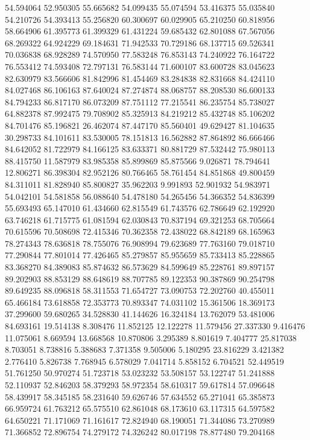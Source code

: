 54.594064
52.950305
55.665682
54.099435
55.074594
53.416375
55.035840
54.210726
54.393413
55.256820
60.300697
60.029905
65.210250
60.818956
58.664906
61.395773
61.399329
61.431224
59.685432
62.801088
67.567056
68.269322
64.924229
69.184631
71.942533
70.729186
68.137715
69.526341
70.036838
68.928289
74.570950
77.583248
76.853143
74.240922
76.164722
76.553412
74.593408
72.797131
76.583144
71.600107
83.600728
83.045623
82.630979
83.566606
81.842996
81.454469
83.284838
82.831668
84.424110
84.027468
86.106163
87.640024
87.274874
88.068757
88.208530
86.600133
84.794233
86.817170
86.073209
87.751112
77.215541
86.235754
85.738027
64.882378
87.992475
79.708902
85.325913
84.219212
85.432748
85.106202
84.701476
85.196821
26.462074
87.447170
85.560401
49.629427
81.104635
30.298733
84.101611
83.530005
78.151813
16.562882
87.864892
86.666466
84.642052
81.722979
84.166125
83.633371
80.881729
87.532442
75.980113
88.415750
11.587979
83.985358
85.899869
85.875566
9.026871
78.794641
12.806271
86.398304
82.952126
80.766465
58.761454
84.851868
49.800459
84.311011
81.828940
85.800827
35.962203
9.991893
52.901932
54.983971
54.042101
54.581858
56.088640
54.478180
54.265456
54.366352
54.836399
55.693493
65.147010
61.434660
62.815549
61.743576
62.786649
62.192920
63.746218
61.715775
61.081594
62.030843
70.837194
69.321253
68.705664
70.615596
70.508698
72.415346
70.362358
72.438022
68.842189
68.165963
78.274343
78.636818
78.755076
76.908994
79.623689
77.763160
79.018710
77.290844
77.801014
77.426465
85.279857
85.955659
85.733413
85.228865
83.368270
84.389083
85.874632
86.573629
84.599649
85.228761
89.897157
89.202903
88.853129
88.648619
88.707785
89.122353
90.387869
90.254798
89.649235
88.096818
58.311553
71.654727
73.090753
72.202760
40.455011
65.466184
73.618858
72.353773
70.893347
74.031102
15.361506
18.369173
37.299600
59.680265
34.528830
41.144626
16.324184
13.762079
53.481006
84.693161
19.514138
8.308476
11.852125
12.122278
11.579456
27.337330
9.416476
11.075061
8.669594
13.668568
10.870806
3.295389
8.801619
7.404777
25.817038
8.703051
8.738816
5.388683
7.371358
9.505006
5.180295
23.816229
3.421382
2.776410
5.826738
7.768945
6.578029
7.041714
5.858152
6.704521
52.449519
51.761250
50.970274
51.723718
53.023232
53.508157
53.122747
51.241888
52.110937
52.846203
58.379293
58.972354
58.610317
59.617814
57.096648
58.439917
58.345185
58.231640
59.626746
57.634552
65.271041
65.385873
66.959724
61.763212
65.575510
62.861048
68.173610
63.117315
64.597582
64.650221
71.171069
71.161617
72.824940
68.190051
71.344086
73.270989
71.366852
72.896754
74.279172
74.326242
80.017198
78.877480
79.204168
